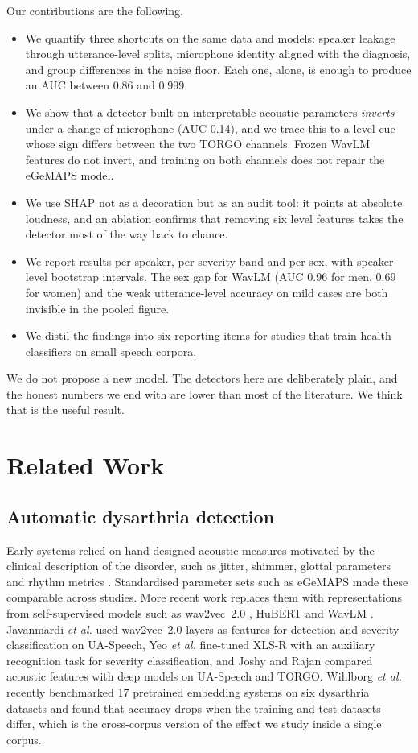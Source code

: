 \documentclass[conference]{IEEEtran}
\begin{document}
Our contributions are the following.
\begin{itemize}
\item We quantify three shortcuts on the same data and models: speaker leakage through utterance-level splits, microphone identity aligned with the diagnosis, and group differences in the noise floor. Each one, alone, is enough to produce an AUC between 0.86 and 0.999.
\item We show that a detector built on interpretable acoustic parameters \emph{inverts} under a change of microphone (AUC 0.14), and we trace this to a level cue whose sign differs between the two TORGO channels. Frozen WavLM features do not invert, and training on both channels does not repair the eGeMAPS model.
\item We use SHAP not as a decoration but as an audit tool: it points at absolute loudness, and an ablation confirms that removing six level features takes the detector most of the way back to chance.
\item We report results per speaker, per severity band and per sex, with speaker-level bootstrap intervals. The sex gap for WavLM (AUC 0.96 for men, 0.69 for women) and the weak utterance-level accuracy on mild cases are both invisible in the pooled figure.
\item We distil the findings into six reporting items for studies that train health classifiers on small speech corpora.
\end{itemize}

We do not propose a new model. The detectors here are deliberately plain, and the honest numbers we end with are lower than most of the literature. We think that is the useful result.

\section{Related Work}
\subsection{Automatic dysarthria detection}
Early systems relied on hand-designed acoustic measures motivated by the clinical description of the disorder, such as jitter, shimmer, glottal parameters and rhythm metrics \cite{narendra2019,rusz2011}. Standardised parameter sets such as eGeMAPS \cite{eyben2016} made these comparable across studies. More recent work replaces them with representations from self-supervised models such as wav2vec~2.0 \cite{baevski2020}, HuBERT \cite{hsu2021} and WavLM \cite{chen2022}. Javanmardi \emph{et al.} \cite{javanmardi2023} used wav2vec~2.0 layers as features for detection and severity classification on UA-Speech, Yeo \emph{et al.} \cite{yeo2023} fine-tuned XLS-R with an auxiliary recognition task for severity classification, and Joshy and Rajan \cite{joshy2022} compared acoustic features with deep models on UA-Speech and TORGO. Wihlborg \emph{et al.} \cite{wihlborg2025} recently benchmarked 17 pretrained embedding systems on six dysarthria datasets and found that accuracy drops when the training and test datasets differ, which is the cross-corpus version of the effect we study inside a single corpus.
\end{document}
